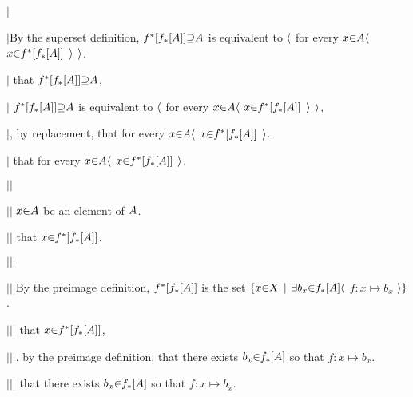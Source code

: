 $|$\hs \par
$|$\hs By the superset definition, $f^*[f_*[\g A]] \p\supseteq \g A$ is equivalent to $\a\langle$ for every $x \p\in \g A \a\langle$ $x \p\in f^*[f_*[\g A]]$ $\a\rangle$ $\a\rangle$. \par
$|$\hs {}  that $f^*[f_*[\g A]] \p\supseteq \g A$, \par
$|$\hs {} $f^*[f_*[\g A]] \p\supseteq \g A$ is equivalent to $\a\langle$ for every $x \p\in \g A \a\langle$ $x \p\in f^*[f_*[\g A]]$ $\a\rangle$ $\a\rangle$, \par
$|$\hs {}, by replacement,  that for every $x \p\in \g A \a\langle$ $x \p\in f^*[f_*[\g A]]$ $\a\rangle$. \par
$|$\hs {} that for every $x \p\in \g A \a\langle$ $x \p\in f^*[f_*[\g A]]$ $\a\rangle$. \par

$|$\hs$|$\hs \par
$|$\hs$|$\hs {} $x \p\in \g A$ be an element of $\g A$. \par
$|$\hs$|$\hs {} that $x \p\in f^*[f_*[\g A]]$. \par

$|$\hs$|$\hs$|$\hs \par
$|$\hs$|$\hs$|$\hs By the preimage definition, $f^*[f_*[\g A]]$ is the set $\a\{x \p\in X \pipe \a\exists b_x \p\in f_*[\g A] \a\langle$ $f: x   \mapsto b_x$ $\a\rangle \a\}$. \par
$|$\hs$|$\hs$|$\hs {}  that $x \p\in f^*[f_*[\g A]]$, \par
$|$\hs$|$\hs$|$\hs {}, by the preimage definition,  that there exists $b_x \p\in f_*[\g A]$ so that $f: x \mapsto b_x$. \par
$|$\hs$|$\hs$|$\hs {} that there exists $b_x \p\in f_*[\g A]$ so that $f: x \mapsto b_x$. \par

